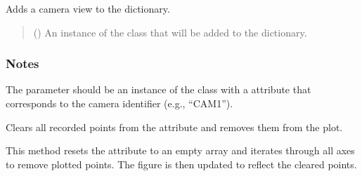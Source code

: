 \documentclass[letterpaper,10pt,english]{sphinxmanual}
\begin{document}
\begin{fulllineitems}
\begin{fulllineitems}
\end{fulllineitems}


\begin{fulllineitems}
\label{\detokenize{CameraUtils:id25}}
\pysigstartsignatures
{}
\pysigstopsignatures
\sphinxAtStartPar
Adds a camera view to the  dictionary.
\begin{quote}\begin{description}
\sphinxAtStartPar
{} ({\hyperref[\detokenize{CameraUtils:CameraUtils.Camera}]{}}) \textendash{} An instance of the  class that will be added to the  dictionary.

\end{description}\end{quote}
\subsubsection*{Notes}

\sphinxAtStartPar
The  parameter should be an instance of the  class with a
 attribute that corresponds to the camera identifier (e.g., “CAM1”).

\end{fulllineitems}


\begin{fulllineitems}
\label{\detokenize{CameraUtils:CameraUtils.PlotCameras.ClearPoints}}
\pysigstartsignatures
{}
\pysigstopsignatures
\sphinxAtStartPar
Clears all recorded points from the  attribute and removes them from the plot.

\sphinxAtStartPar
This method resets the  attribute to an empty array and iterates through all axes to remove plotted points. The figure is then updated to reflect the cleared points.


\end{fulllineitems}
\end{fulllineitems}
\end{document}
